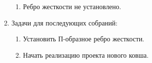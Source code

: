 \begin{enumerate}
\begin{enumerate}
	  \item Ребро жесткости не установлено.
	  
    \end{enumerate}
    
	\item Задачи для последующих собраний:
	\begin{enumerate}
	  \item Установить П-образное ребро жесткости.
	  
	  \item Начать реализацию проекта нового ковша.
	  
    \end{enumerate}     
\end{enumerate}
\fillpage